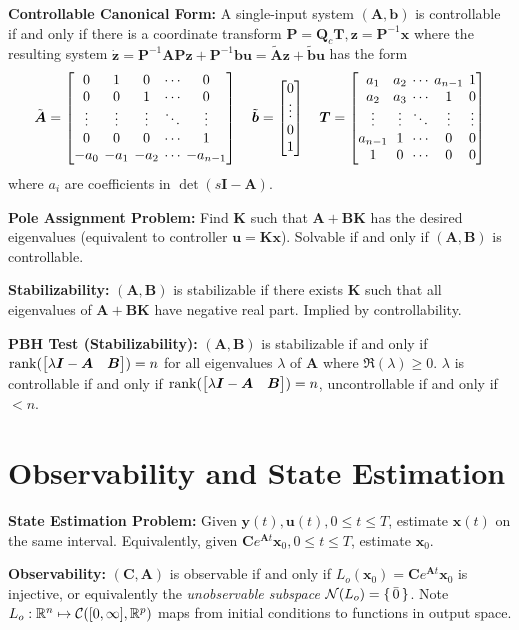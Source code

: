 \documentclass[twocolumn, 8pt]{extarticle}
\newcommand{\newvdots}{\vphantom{\int\limits^x}\smash[t]{\vdots}}
\newcommand{\newddots}{\vphantom{\int\limits^x}\smash[t]{\ddots}}
\begin{document}
\textbf{Controllable Canonical Form:} A single-input system \((\bm A, \bm b)\) is controllable if and only if there
is a coordinate transform \(\bm P = \bm Q_c\bm T, \bm z = \bm P^{-1}\bm x\) where the resulting system
\(\dot{\bm z} = \bm P^{-1}\bm A\bm P\bm z + \bm P^{-1}\bm b\bm u = \tilde{\bm A}\bm z + \tilde{\bm b}\bm u\)
has the form
\[\begingroup\setlength{\arraycolsep}{2pt}
\tilde{\bm A} = \mat{\mrow{0}{1}{0}{\cdots}{0}\mrow{0}{0}{1}{\cdots}{0}\mrow{\newvdots}{\newvdots}{\newvdots}{\newddots}{\newvdots}\mrow{0}{0}{0}{\cdots}{1}\mrow{-a_0}{-a_1}{-a_2}{\cdots}{-a_{n - 1}}}
\quad \tilde{\bm b} = \cvec{0}{\newvdots}{0}{1}
\quad \bm T = \mat{\mrow{a_1}{a_2}{\cdots}{a_{n - 1}}{1}\mrow{a_2}{a_3}{\cdots}{1}{0}\mrow{\newvdots}{\newvdots}{\newddots}{\newvdots}{\newvdots}\mrow{a_{n - 1}}{1}{\cdots}{0}{0}\mrow{1}{0}{\cdots}{0}{0}}
\endgroup\]
where \(a_i\) are coefficients in \(\det(s\bm I - \bm A)\).

\textbf{Pole Assignment Problem:} Find \(\bm K\) such that \(\bm A + \bm B\bm K\) has the desired eigenvalues
(equivalent to controller \(\bm u = \bm K\bm x\)). Solvable if and only if \((\bm A, \bm B)\) is controllable.

\textbf{Stabilizability:} \((\bm A, \bm B)\) is stabilizable if there exists \(\bm K\) such that all eigenvalues of
\(\bm A + \bm B\bm K\) have negative real part. Implied by controllability.

\textbf{PBH Test (Stabilizability):} \((\bm A, \bm B)\) is stabilizable if and only if
\(\rank(\rvec{\lambda\bm I - \bm A}{\bm B}) = n\) for all eigenvalues \(\lambda\) of \(\bm A\) where
\(\Re(\lambda) \geq 0\). \(\lambda\) is controllable if and only if
\(\rank(\rvec{\lambda\bm I - \bm A}{\bm B}) = n\), uncontrollable if and only if \(< n\).

\section{Observability and State Estimation}

\textbf{State Estimation Problem:} Given \(\bm y(t), \bm u(t), 0 \leq t \leq T\), estimate \(\bm x(t)\) on the same interval.
Equivalently, given \(\bm Ce^{\bm At}\bm x_0, 0 \leq t \leq T\), estimate \(\bm x_0\).

\textbf{Observability:} \((\bm C, \bm A)\) is observable if and only if \(L_o(\bm x_0) = \bm Ce^{\bm At}\bm x_0\) is
injective, or equivalently the \textit{unobservable subspace} \(\mathcal N(L_o) = \set{\bar 0}\). Note \(L_o: \mathbb{R}^n
\mapsto \mathcal C([0, \infty], \mathbb{R}^p)\) maps from initial conditions to functions in output space.
\end{document}
